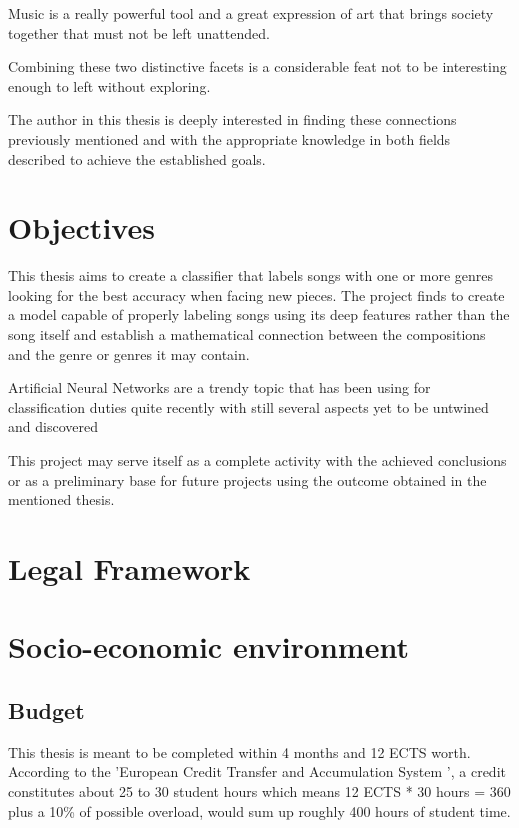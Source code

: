 Music is a really powerful tool and a great expression of art that brings society together that must not be left unattended.

Combining these two distinctive facets is a considerable feat not to be interesting enough to left without exploring.

The author in this thesis is deeply interested in finding these connections previously mentioned and with the appropriate knowledge in both fields described to achieve the established goals.
\newpage

\section{Objectives}
This thesis aims to create a classifier that labels songs with one or more genres looking for the best accuracy when facing new pieces. The project finds to create a model capable of properly labeling songs using its deep features rather than the song itself and establish a mathematical connection between the compositions and the genre or genres it may contain.

Artificial Neural Networks are a trendy topic that has been using for classification duties quite recently with still several aspects yet to be untwined and discovered

This project may serve itself as a complete activity with the achieved conclusions or as a preliminary base for future projects using the outcome obtained in the mentioned thesis.

\newpage
\section{Legal Framework}


\newpage

\section{Socio-economic environment}
\subsection{Budget}

This thesis is meant to be completed within 4 months and 12 ECTS worth. 
According to the 'European Credit Transfer and Accumulation System \cite{EuropeanCommission2009}', 
a credit constitutes about 25 to 30 student hours which means 12 ECTS * 30 hours = 360 plus a 10\% of possible overload, would sum up roughly 400 hours of student time.

